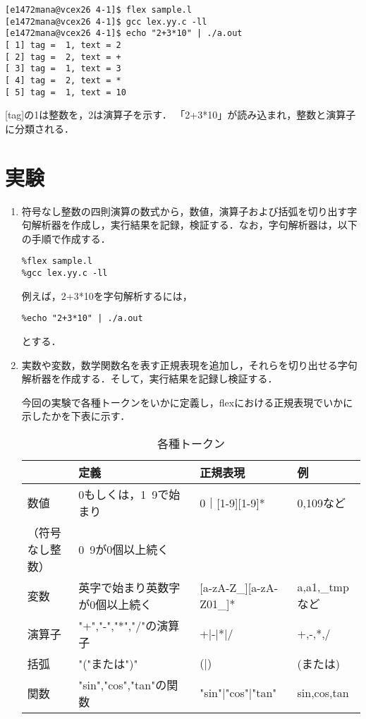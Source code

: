\documentclass[a4j]{jsarticle}  %
\begin{document}
\begin{screen}
\begin{verbatim}
[e1472mana@vcex26 4-1]$ flex sample.l
[e1472mana@vcex26 4-1]$ gcc lex.yy.c -ll
[e1472mana@vcex26 4-1]$ echo "2+3*10" | ./a.out
[ 1] tag =  1, text = 2
[ 2] tag =  2, text = +
[ 3] tag =  1, text = 3
[ 4] tag =  2, text = *
[ 5] tag =  1, text = 10
\end{verbatim}
\end{screen}

[tag]の1は整数を，2は演算子を示す．
「2+3*10」が読み込まれ，整数と演算子に分類される．


\section{実験}
\begin{enumerate}
\item 符号なし整数の四則演算の数式から，数値，演算子および括弧を切り出す字句解析器を作成し，実行結果を記録，検証する．なお，字句解析器は，以下の手順で作成する．
  \begin{screen}
\begin{verbatim}
%flex sample.l
%gcc lex.yy.c -ll
\end{verbatim}
  \end{screen}
例えば，2+3*10を字句解析するには，
  \begin{screen}
\begin{verbatim}
%echo "2+3*10" | ./a.out
\end{verbatim}
  \end{screen}
とする．

\item 実数や変数，数学関数名を表す正規表現を追加し，それらを切り出せる字句解析器を作成する．そして，実行結果を記録し検証する．

今回の実験で各種トークンをいかに定義し，flexにおける正規表現でいかに示したかを下表に示す．

\begin{table}[htb]
  \begin{center}
    \caption{各種トークン}
    \begin{tabular}{l|l|l|l}\hline
      & 定義 & 正規表現 & 例 \\ \hline
      数値 & 0もしくは，1~9で始まり & 0｜[1-9][1-9]* & 0,109など\\
      （符号なし整数） & 0~9が0個以上続く & & \\
      変数 & 英字で始まり英数字が0個以上続く & [a-zA-Z\_][a-zA-Z01\_]* & a,a1,\_tmpなど \\
      演算子 & "+","-","*","/"の演算子 & +|-|*|/ & +,-,*,/ \\
      括弧 & "("または")" &  (|) & (または)\\
      関数 & "sin","cos","tan"の関数 & "sin"|"cos"|"tan" & sin,cos,tan\\ \hline
    \end{tabular}
  \end{center}
\end{table}
\end{enumerate}
\end{document}
